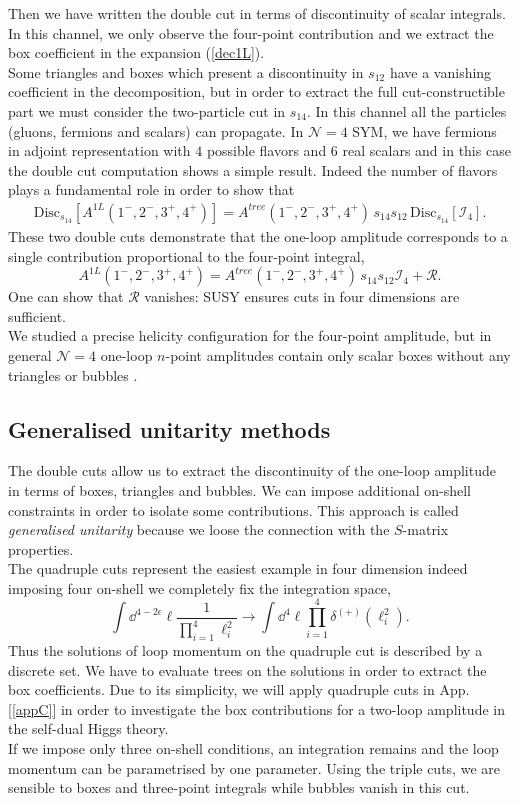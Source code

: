 Then we have written the double cut in terms of discontinuity of scalar integrals. In this channel, we only observe the four-point contribution and we extract the box coefficient in the expansion (\ref{dec1L}).\\
Some triangles and boxes which present a discontinuity in $s_{12}$ have a vanishing coefficient in the decomposition, but in order to extract the full cut-constructible part we must consider the two-particle cut in $s_{14}$. In this channel all the particles (gluons, fermions and scalars) can propagate. In $\mathcal{N}=4$ SYM, we have fermions in adjoint representation with $4$ possible flavors and $6$ real scalars and in this case the double cut computation shows a simple result. Indeed the number of flavors plays a fundamental role in order to show that \cite{Henn:2014yza}
\begin{align*}
	\text{Disc}_{s_{14}}\left[A^{1L}(1^-,2^-,3^+,4^+)\right]=A^{tree}(1^-,2^-,3^+,4^+)\, s_{14}s_{12} \,\text{Disc}_{s_{14}}[\mathcal{I}_4].
\end{align*}
These two double cuts demonstrate that the one-loop amplitude corresponds to a single contribution proportional to the four-point integral,
$$
	A^{1L}(1^-,2^-,3^+,4^+)=A^{tree}(1^-,2^-,3^+,4^+)\, s_{14}s_{12} \mathcal{I}_4 +\mathcal{R}.
$$
One can show that $\mathcal{R}$ vanishes: SUSY ensures cuts in four dimensions are sufficient.\\
We studied a precise helicity configuration for the four-point amplitude, but in general $\mathcal{N}=4$ one-loop $n$-point amplitudes contain only scalar boxes without any triangles or bubbles \cite{Bern_1994}.
\subsection{Generalised unitarity methods}
The double cuts allow us to extract the discontinuity of the one-loop amplitude in terms of boxes, triangles and bubbles. We can impose additional on-shell constraints in order to isolate some contributions. This approach is called \textit{generalised unitarity} because we loose the connection with the $S$-matrix properties.\\
The quadruple cuts represent the easiest example in four dimension indeed imposing four on-shell we completely fix the integration space,
$$
	\int \dd^{4-2\epsilon} \ell \frac{1}{\prod_{i=1}^4 \ell_i^2} \rightarrow \int \dd^4 \ell \prod_{i=1}^4 \delta^{(+)} (\ell_i^2).
$$
Thus the solutions of loop momentum on the quadruple cut is described by a discrete set. We have to evaluate trees on the solutions in order to extract the box coefficients. Due to its simplicity, we will apply quadruple cuts in App. [\ref{appC}] in order to investigate the box contributions for a two-loop amplitude in the self-dual Higgs theory.\\
If we impose only three on-shell conditions, an integration remains and the loop momentum can be parametrised by one parameter. Using the triple cuts, we are sensible to boxes and three-point integrals while bubbles vanish in this cut.
